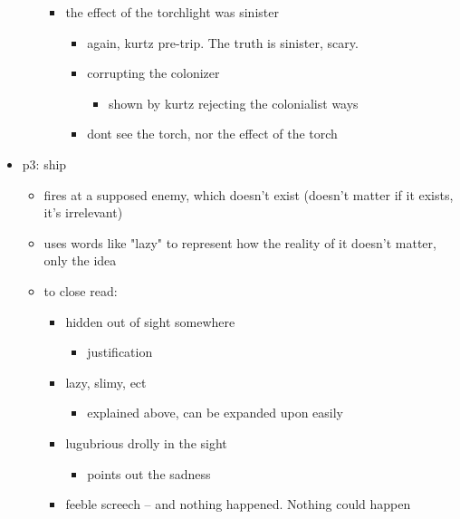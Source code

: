 \documentclass[letterpaper]{article}
\begin{document}
\begin{itemize}
\begin{itemize}
\begin{itemize}
\item the effect of the torchlight was sinister

\begin{itemize}
\item again, kurtz pre-trip. The truth is sinister, scary.
\item corrupting the colonizer

\begin{itemize}
\item shown by kurtz rejecting the colonialist ways
\end{itemize}

\item dont see the torch, nor the effect of the torch
\end{itemize}
\end{itemize}
\end{itemize}

\item p3: ship

\begin{itemize}
\item fires at a supposed enemy, which doesn't exist (doesn't matter if it
exists, it's irrelevant)
\item uses words like "lazy" to represent how the reality of it doesn't
matter, only the idea
\item to close read:

\begin{itemize}
\item hidden out of sight somewhere

\begin{itemize}
\item justification
\end{itemize}

\item lazy, slimy, ect

\begin{itemize}
\item explained above, can be expanded upon easily
\end{itemize}

\item lugubrious drolly in the sight

\begin{itemize}
\item points out the sadness
\end{itemize}

\item feeble screech -- and nothing happened. Nothing could happen


\end{itemize}
\end{itemize}
\end{itemize}
\end{document}
